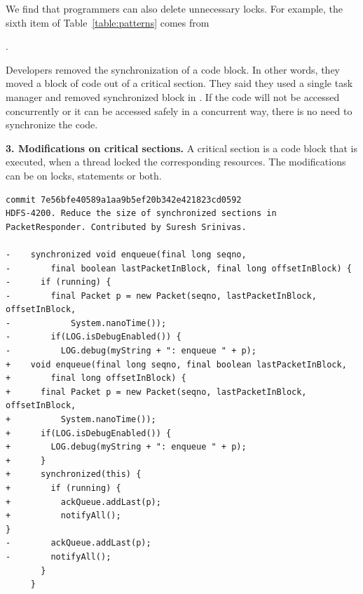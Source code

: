We find that programmers can also delete unnecessary locks. For example, the sixth item of Table~\ref{table:patterns} comes from  

.


Developers removed the synchronization of a code block. In other words, they moved a block of code out of a critical section. They said they used a single task manager and removed synchronized block in . If the code will not be accessed concurrently or it can be accessed safely in a concurrent way, there is no need to synchronize the code.

\noindent
\textbf{3. Modifications on critical sections.} A critical section is a code block that is executed, when a thread locked the corresponding resources. The modifications can be on locks, statements or both.%





\begin{lstlisting}
commit 7e56bfe40589a1aa9b5ef20b342e421823cd0592
HDFS-4200. Reduce the size of synchronized sections in PacketResponder. Contributed by Suresh Srinivas.

-    synchronized void enqueue(final long seqno,
-        final boolean lastPacketInBlock, final long offsetInBlock) {
-      if (running) {
-        final Packet p = new Packet(seqno, lastPacketInBlock, offsetInBlock,
-            System.nanoTime());
-        if(LOG.isDebugEnabled()) {
-          LOG.debug(myString + ": enqueue " + p);
+    void enqueue(final long seqno, final boolean lastPacketInBlock,
+        final long offsetInBlock) {
+      final Packet p = new Packet(seqno, lastPacketInBlock, offsetInBlock,
+          System.nanoTime());
+      if(LOG.isDebugEnabled()) {
+        LOG.debug(myString + ": enqueue " + p);
+      }
+      synchronized(this) {
+        if (running) {
+          ackQueue.addLast(p);
+          notifyAll();
}
-        ackQueue.addLast(p);
-        notifyAll();
       }
     }
\end{lstlisting}

